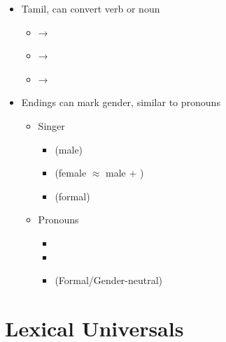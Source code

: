 \documentclass[headrule,footrule]{foils}
\begin{document}
\begin{itemize}\addtolength{\itemsep}{-1em}
\item Tamil, can convert verb or noun
  \begin{itemize}
  \item  {}  →  
\item  {}  →  
\item {}  →  
  \end{itemize}
\item Endings can mark gender, similar to pronouns
  \begin{itemize}
  \item Singer
    \begin{itemize}
    \item {}    (male)
    \item  {}  (female \ensuremath{\approx} male
      +   )
      \item  {}  (formal)
    \end{itemize}
  \item Pronouns
    \begin{itemize}
    \item   {} 
    \item   {} 
    \item   {}  (Formal/Gender-neutral)
 
    \end{itemize}
  \end{itemize}
\end{itemize}

\section{Lexical Universals}

\end{document}
